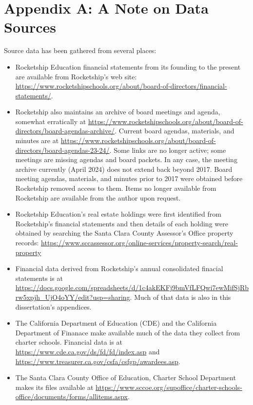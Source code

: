 
\chapter{Appendix A: A Note on Data Sources}\indent%


Source data has been gathered from several places:
\begin{itemize}
  \item Rocketship Education financial statements from its founding to the present are available from Rocketship's web site: \url{https://www.rocketshipschools.org/about/board-of-directors/financial-statements/}.
  \item Rocketship also maintains an archive of board meetings and agenda, somewhat erratically at \url{https://www.rocketshipschools.org/about/board-of-directors/board-agendas-archive/}. Current board agendas, materials, and minutes are at \url{https://www.rocketshipschools.org/about/board-of-directors/board-agendas-23-24/}. Some links are no longer active; some meetings are missing agendas and board packets. In any case, the meeting archive currently (April 2024) does not extend back beyond 2017. Board meeting agendas, materials, and minutes prior to 2017 were obtained before Rocketship removed access to them. Items no longer available from Rocketship are available from the author upon request.
  \item Rocketship Education's real estate holdings were first identified from Rocketship's financial statements and then details of each holding were obtained by searching the Santa Clara County Assessor's Office property records: \url{https://www.sccassessor.org/online-services/property-search/real-property}
  \item Financial data derived from Rocketship's annual consolidated finacial statements is at \url{https://docs.google.com/spreadsheets/d/1c4akEKFj9bmVfLFQwi7ewMifSjRbrw5xpjh_UjO4oYY/edit?usp=sharing}. Much of that data is also in this dissertation's appendices.
  \item The California Department of Education (CDE) and the California Department of Finanace make available much of the data they collect from charter schools. Financial data is at \url{https://www.cde.ca.gov/ds/fd/fd/index.asp} and \url{https://www.treasurer.ca.gov/csfa/csfgp/awardees.asp}.
  \item The Santa Clara County Office of Education, Charter School Department makes its files available at \url{https://www.sccoe.org/supoffice/charter-schools-office/documents/forms/allitems.aspx}.
\end{itemize}

